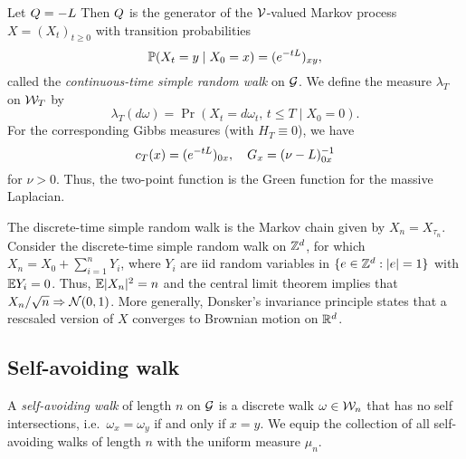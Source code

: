 Let $Q = -L$
Then $Q$ is the generator of the $\mathcal{V}$-valued Markov process
$X = (X_t)_{t \ge 0}$ with transition probabilities
\begin{equation}
\operatorname{\mathbb{P}}(X_t = y \mid X_0 = x) = (e^{-t L})_{xy},
\end{equation}
called the \emph{continuous-time simple random walk} on $\mathcal{G}$.
We define the measure $\lambda_T$ on $\mathcal{W}_T$ by
\begin{equation}
\lambda_T(d\omega) = \Pr(X_t = d\omega_t, \, t \le T \mid X_0 = 0).
\end{equation}
For the corresponding Gibbs measures (with $H_T \equiv 0$), we have
\begin{equation}
c_T(x) = (e^{-t L})_{0x},
  \quad
G_x = (\nu - L)^{-1}_{0x}
\end{equation}
for $\nu > 0$. Thus, the two-point function is the Green function for the
massive Laplacian.

\begin{example}
The discrete-time simple random walk is the Markov chain given by
$X_n = X_{\tau_n}$. Consider the discrete-time simple random walk on ${ {{\mathbb Z}}^d }$, for which $X_n = X_0 + \sum_{i=1}^n Y_i$, where $Y_i$ are iid random variables in $\{ e \in { {{\mathbb Z}}^d } : |e| = 1 \}$ with $\mathbb{E} Y_i = 0$. Thus, $\mathbb{E} |X_n|^2 = n$ and the central limit theorem implies that
$X_n / \sqrt n \Rightarrow \mathcal{N}(0, 1)$. More generally, Donsker's invariance principle states that a rescsaled version of $X$ converges to Brownian motion on ${ {{\mathbb R}}^d}$.
\end{example}


\subsection{Self-avoiding walk}

A \emph{self-avoiding walk} of length $n$ on $\mathcal{G}$ is a discrete walk $\omega\in\mathcal{W}_n$ that has no self intersections, i.e.\ $\omega_x = \omega_y$ if and only if $x = y$. We equip the collection of all self-avoiding walks of length $n$ with the uniform measure $\mu_n$.

